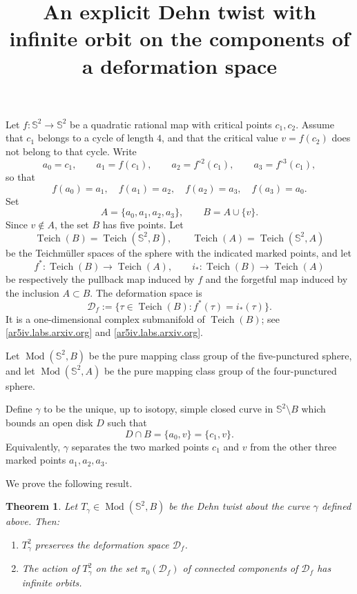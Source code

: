 \documentclass[11pt]{article}
\title{An explicit Dehn twist with infinite orbit on the components of a deformation space}
\author{}
\date{}
\newtheorem{theorem}{Theorem}
\theoremstyle{remark}
\DeclareMathOperator{\Teich}{Teich}
\DeclareMathOperator{\Mod}{Mod}
\begin{document}
\maketitle

Let \(f:\mathbb{S}^2\to \mathbb{S}^2\) be a quadratic rational map with critical points \(c_1,c_2\).
Assume that \(c_1\) belongs to a cycle of length \(4\), and that the critical value
\(v=f(c_2)\) does not belong to that cycle. Write
\[
a_0=c_1,\qquad a_1=f(c_1),\qquad a_2=f^{\circ 2}(c_1),\qquad a_3=f^{\circ 3}(c_1),
\]
so that
\[
f(a_0)=a_1,\quad f(a_1)=a_2,\quad f(a_2)=a_3,\quad f(a_3)=a_0.
\]
Set
\[
A=\{a_0,a_1,a_2,a_3\},\qquad B=A\cup\{v\}.
\]
Since \(v\notin A\), the set \(B\) has five points. Let
\[
\Teich(B)=\Teich(\mathbb{S}^2,B),\qquad \Teich(A)=\Teich(\mathbb{S}^2,A)
\]
be the Teichm\"uller spaces of the sphere with the indicated marked points, and let
\[
f^*:\Teich(B)\to \Teich(A),\qquad i_*:\Teich(B)\to \Teich(A)
\]
be respectively the pullback map induced by \(f\) and the forgetful map induced by the inclusion
\(A\subset B\). The deformation space is
\[
\mathcal D_f:=\{\tau\in \Teich(B): f^*(\tau)=i_*(\tau)\}.
\]
It is a one-dimensional complex submanifold of \(\Teich(B)\); see
\href{https://ar5iv.labs.arxiv.org/html/1606.00723}{[ar5iv.labs.arxiv.org]} and
\href{https://ar5iv.labs.arxiv.org/html/1602.07378}{[ar5iv.labs.arxiv.org]}.

Let \(\Mod(\mathbb{S}^2,B)\) be the pure mapping class group of the five-punctured sphere,
and let \(\Mod(\mathbb{S}^2,A)\) be the pure mapping class group of the four-punctured sphere.

\begin{definition}
Define \(\gamma\) to be the unique, up to isotopy, simple closed curve in
\(\mathbb{S}^2\setminus B\) which bounds an open disk \(D\) such that
\[
D\cap B=\{a_0,v\}=\{c_1,v\}.
\]
Equivalently, \(\gamma\) separates the two marked points \(c_1\) and \(v\) from the other three
marked points \(a_1,a_2,a_3\).
\end{definition}

We prove the following result.

\begin{theorem}
Let \(T_\gamma\in \Mod(\mathbb{S}^2,B)\) be the Dehn twist about the curve \(\gamma\) defined above.
Then:
\begin{enumerate}
\item \(T_\gamma^2\) preserves the deformation space \(\mathcal D_f\).
\item The action of \(T_\gamma^2\) on the set \(\pi_0(\mathcal D_f)\) of connected components of
\(\mathcal D_f\) has infinite orbits.
\end{enumerate}
\end{theorem}
\end{document}
